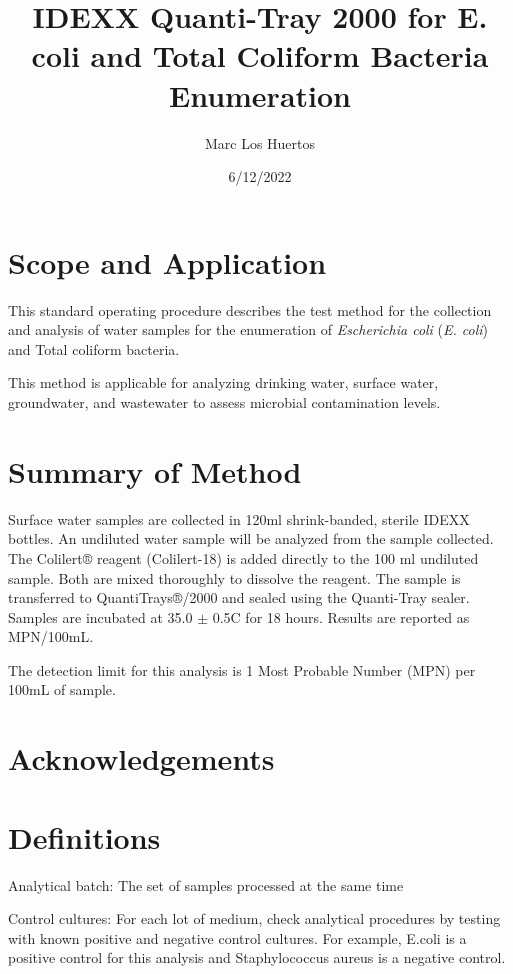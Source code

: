 \documentclass[12pt]{../SOP4_alpha}\usepackage[]{graphicx}\usepackage[]{xcolor}
\title{IDEXX Quanti-Tray 2000 for E. coli and Total Coliform Bacteria Enumeration}
\date{6/12/2022}
\author{Marc Los Huertos}
\begin{document}
\maketitle

\section{Scope and Application}

\NP This standard operating procedure describes the test method for the collection and analysis of water samples for the enumeration of \emph{Escherichia coli} (\emph{E. coli}) and Total coliform bacteria.

\NP This method is applicable for analyzing drinking water, surface water, groundwater, and wastewater to assess microbial contamination levels.

\section{Summary of Method}

\NP Surface water samples are collected in 120ml shrink-banded, sterile IDEXX 
bottles. An undiluted water sample will be analyzed from the sample collected.
The Colilert® reagent  (Colilert-18)  is added directly to the 100 ml undiluted sample. Both 
are mixed thoroughly to dissolve the reagent. The sample is transferred to 
QuantiTrays®/2000 and sealed using the Quanti-Tray sealer. Samples are incubated  at 35.0 $\pm$ 0.5\degree C for 18 hours. Results are reported as MPN/100mL. 

\NP The detection limit for this analysis is 1 Most Probable Number (MPN) per 100mL of sample. 

\tableofcontents

\newpage

\section{Acknowledgements}

\section{Definitions}

\NP Analytical batch: The set of samples processed at the same time

\NP Control cultures: For each lot of medium, check analytical procedures by
testing with known positive and negative control cultures. For example,
E.coli is a positive control for this analysis and Staphylococcus aureus is a
negative control.
\end{document}
